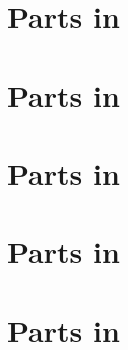 \section{Parts in \mxsrToMsr{}}


\section{Parts in \mxsrToMsr{}}


\section{Parts in \msrToMsr{}}


\section{Parts in \msrToLpsr{}}


\section{Parts in \lpsrToLilypond{}}


